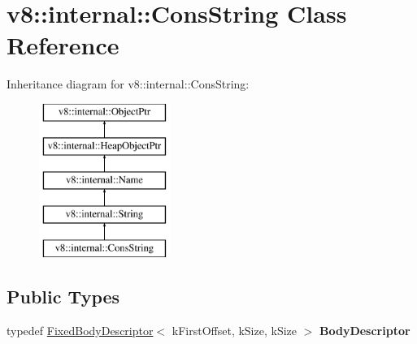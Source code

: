 \hypertarget{classv8_1_1internal_1_1ConsString}{}\section{v8\+:\+:internal\+:\+:Cons\+String Class Reference}
\label{classv8_1_1internal_1_1ConsString}
Inheritance diagram for v8\+:\+:internal\+:\+:Cons\+String\+:\begin{figure}[H]
\begin{center}
\leavevmode
\includegraphics[height=5.000000cm]{classv8_1_1internal_1_1ConsString}
\end{center}
\end{figure}
\subsection*{Public Types}
\begin{DoxyCompactItemize}
\item 
\mbox{\label{classv8_1_1internal_1_1ConsString_a53bb1ff1259a908c9cdf98505d053ea1}} 
typedef \mbox{\hyperlink{classv8_1_1internal_1_1FixedBodyDescriptor}{Fixed\+Body\+Descriptor}}$<$ k\+First\+Offset, k\+Size, k\+Size $>$ {\bfseries Body\+Descriptor}
\end{DoxyCompactItemize}
